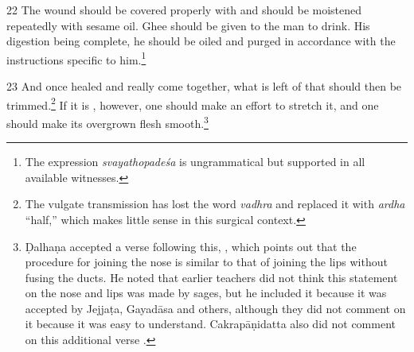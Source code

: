\begin{translation}
    \item[22] 
    The wound should be covered properly with  and should be
    moistened repeatedly with sesame oil.  Ghee should be given to the man to
    drink.  His digestion being complete, he should be oiled and purged in
    accordance with the instructions specific to him.\footnote{The expression 
    \emph{svayathopadeśa} is ungrammatical but supported in all available 
    witnesses.}   
    
    \item[23] %
And once healed and really come together, what is left of that  should then be trimmed.\footnote{The vulgate transmission has lost the
    word \emph{vadhra} and replaced it with \emph{ardha} “half,” which makes little
    sense in this surgical  context.} If it is , however, one should
    make an effort to stretch it, and one should make its overgrown flesh
    smooth.\footnote{Ḍalhaṇa  accepted a verse following this, , which
        points out that the procedure for joining the nose is similar to that of joining
        the lips without fusing the ducts. He noted that earlier teachers did not think
        this statement on the nose and lips was made by sages, but he included it because
        it was accepted by Jejjaṭa, Gayadāsa and others, although they did not comment on
        it because it was easy to understand. Cakrapāṇidatta also did not comment on this
        additional verse \citep[133]{acar-1939}.}
    
    
\end{translation}    
